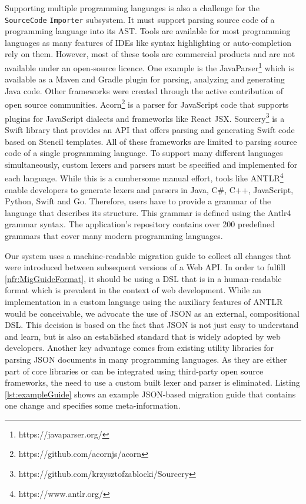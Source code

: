  Supporting multiple programming languages is also a challenge for the \texttt{Source\-Code} \texttt{Importer} subsystem. It must support parsing source code of a programming language into its \ac{AST}. Tools are available for most programming languages as many features of \acp{IDE} like syntax highlighting or auto-completion rely on them. However, most of these tools are commercial products and are not available under an open-source licence. One example is the JavaParser\footnote{https://javaparser.org/} which is available as a Maven and Gradle plugin for parsing, analyzing and generating Java code. Other frameworks were created through the active contribution of open source communities. Acorn\footnote{https://github.com/acornjs/acorn} is a parser for JavaScript code that supports plugins for JavaScript dialects and frameworks like React JSX. Sourcery\footnote{https://github.com/krzysztofzablocki/Sourcery} is a Swift library that provides an \ac{API} that offers parsing and generating Swift code based on Stencil templates. All of these frameworks are limited to parsing source code of a single programming language. To support many different languages simultaneously, custom lexers and parsers must be specified and implemented for each language. While this is a cumbersome manual effort, tools like \ac{ANTLR}\footnote{https://www.antlr.org/} enable developers to generate lexers and parsers in Java, C\#, C++, JavaScript, Python, Swift and Go. Therefore, users have to provide a grammar of the language that describes its structure. This grammar is defined using the Antlr4 grammar syntax. The application's repository contains over 200 predefined grammars that cover many modern programming languages.
 
 Our system uses a machine-readable migration guide to collect all changes that were introduced between subsequent versions of a Web API. In order to fulfill \ref{nfr:MigGuideFormat}, it should be using a \ac{DSL} that is in a human-readable format which is prevalent in the context of web development. While an implementation in a custom language using the auxiliary features of ANTLR would be conceivable, we advocate the use of \ac{JSON} as an external, compositional DSL. This decision is based on the fact that JSON is not just easy to understand and learn, but is also an established standard that is widely adopted by web developers. Another key advantage comes from existing utility libraries for parsing JSON documents in many programming languages. As they are either part of core libraries or can be integrated using third-party open source frameworks, the need to use a custom built lexer and parser is eliminated. Listing \ref{lst:exampleGuide} shows an example JSON-based migration guide that contains one change and specifies some meta-information.
 
